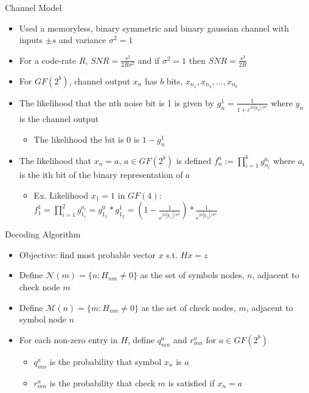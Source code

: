 \documentclass[10pt,ignorenonframetext,]{beamer}
\providecommand{\tightlist}{%
  \setlength{\itemsep}{0pt}\setlength{\parskip}{0pt}}
\begin{document}
\begin{frame}{Channel Model}
\protect\hypertarget{channel-model}{}
\begin{itemize}[<+->]
\tightlist
\item
  Used a memoryless, binary symmetric and binary gaussian channel with
  inputs \(\pm s\) and variance \(\sigma^2=1\)
\item
  For a code-rate \(R\), \(SNR=\frac{s^2}{2R\sigma^2}\) and if
  \(\sigma^2=1\) then \(SNR=\frac{s^2}{2R}\)
\item
  For \(GF(2^b)\), channel output \(x_n\) has \(b\) bits,
  \(x_{n_1},x_{n_2},\dots,x_{n_b}\)
\item
  The likelihood that the nth noise bit is 1 is given by
  \(g_n^1=\frac{1}{1+e^{2s|y_n|/\sigma^2}}\) where \(y_n\) is the
  channel output

  \begin{itemize}[<+->]
  \tightlist
  \item
    The likelihood the bit is 0 is \(1-g_n^1\)
  \end{itemize}
\item
  The likelihood that \(x_n=a\), \(a\in GF(2^b)\) is defined
  \(f^a_n:=\prod_{i=1}^b g^{a_i}_{n_i}\) where \(a_i\) is the ith bit of
  the binary representation of \(a\)

  \begin{itemize}[<+->]
  \tightlist
  \item
    Ex. Likelihood \(x_1=1\) in \(GF(4)\):
    \(f^1_1 = \prod_{i=1}^2 g^{a_i}_{1_i} = g^{0}_{1_1} * g^1_{1_2} = (1-\frac{1}{e^{2s|y_{1_1}|/\sigma^2}}) * \frac{1}{e^{2s|y_{1_2}|/\sigma^2}}\)
  \end{itemize}
\end{itemize}
\end{frame}

\begin{frame}{Decoding Algorithm}
\protect\hypertarget{decoding-algorithm}{}
\begin{itemize}[<+->]
\tightlist
\item
  Objective: find most probable vector \(x\) s.t. \(Hx=z\)
\item
  Define \(\mathcal{N}(m) = \{n:H_{nm}\neq 0\}\) as the set of symbols
  nodes, \(n\), adjacent to check node \(m\)
\item
  Define \(\mathcal{M}(n) = \{m:H_{nm}\neq 0\}\) as the set of check
  nodes, \(m\), adjacent to symbol node \(n\)
\item
  For each non-zero entry in \(H\), define \(q_{mn}^a\) and \(r_{mn}^a\)
  for \(a\in GF(2^b)\)

  \begin{itemize}[<+->]
  \tightlist
  \item
    \(q_{mn}^a\) is the probability that symbol \(x_n\) is \(a\)
  \item
    \(r_{mn}^a\) is the probability that check \(m\) is satisfied if
    \(x_n=a\)
  \end{itemize}
\end{itemize}
\end{frame}
\end{document}
